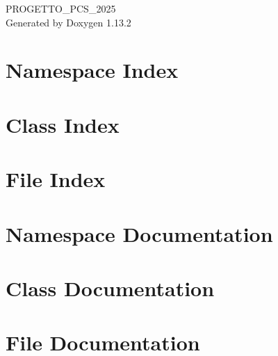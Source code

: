 \documentclass[twoside]{book}
\newcommand{\+}{\discretionary{\mbox{\scriptsize$\hookleftarrow$}}{}{}}
\newcommand{\clearemptydoublepage}{%
    \newpage{\pagestyle{empty}\cleardoublepage}%
  }
\begin{document}
  \raggedbottom
    \hypersetup{pageanchor=false,
                bookmarksnumbered=true,
                pdfencoding=unicode
               }
  \begin{titlepage}
  \vspace*{7cm}
  \begin{center}%
  {\Large PROGETTO\+\_\+\+PCS\+\_\+2025}\\
  \vspace*{1cm}
  {\large Generated by Doxygen 1.13.2}\\
  \end{center}
  \end{titlepage}
  \clearemptydoublepage
  \tableofcontents
  \clearemptydoublepage
  \hypersetup{pageanchor=true}
\chapter{Namespace Index}

\chapter{Class Index}

\chapter{File Index}

\chapter{Namespace Documentation}




\chapter{Class Documentation}

\chapter{File Documentation}














  \backmatter
  \newpage
  \clearemptydoublepage
  \printindex
\end{document}
